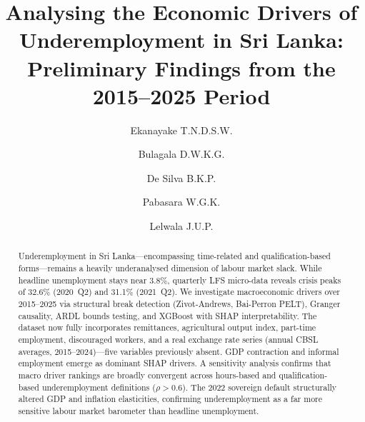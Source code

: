 \documentclass[sigconf]{acmart}
\begin{document}
\title{Analysing the Economic Drivers of Underemployment in Sri Lanka: Preliminary Findings from the 2015--2025 Period}

\author{Ekanayake T.N.D.S.W.}

\author{Bulagala D.W.K.G.}

\author{De Silva B.K.P.}

\author{Pabasara W.G.K.}

\author{Lelwala J.U.P.}

\begin{abstract}
Underemployment in Sri Lanka---encompassing time-related and
qualification-based forms---remains a heavily underanalysed dimension of
labour market slack. While headline unemployment stays near 3.8\%, quarterly
LFS micro-data reveals crisis peaks of 32.6\% (2020~Q2) and 31.1\%
(2021~Q2). We investigate macroeconomic drivers over 2015--2025 via
structural break detection (Zivot-Andrews, Bai-Perron PELT), Granger
causality, ARDL bounds testing, and XGBoost with SHAP interpretability.
The dataset now fully incorporates remittances, agricultural output index,
part-time employment, discouraged workers, and a real exchange rate series
(annual CBSL averages, 2015--2024)---five variables previously absent.
GDP contraction and informal employment emerge as dominant SHAP drivers.
A sensitivity analysis confirms that macro driver rankings are broadly
convergent across hours-based and qualification-based underemployment
definitions ($\rho{>}0.6$). The 2022 sovereign default structurally altered
GDP and inflation elasticities, confirming underemployment as a far more
sensitive labour market barometer than headline unemployment.
\end{abstract}


\maketitle
\end{document}
